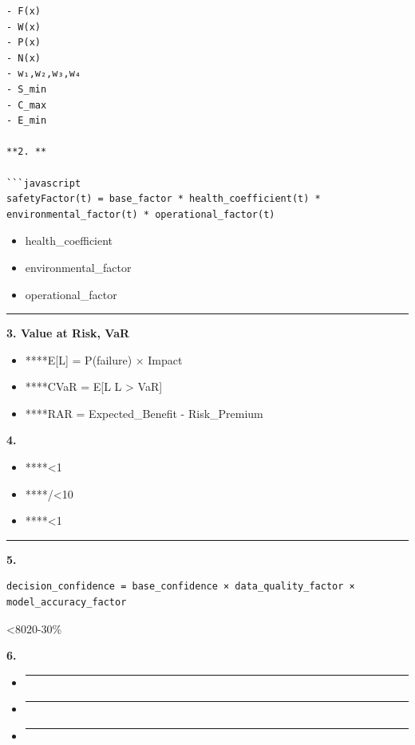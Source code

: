 \begin{verbatim}
- F(x)
- W(x)  
- P(x)
- N(x)
- w₁,w₂,w₃,w₄
- S_min
- C_max
- E_min

**2. **

```javascript
safetyFactor(t) = base_factor * health_coefficient(t) * environmental_factor(t) * operational_factor(t)
\end{verbatim}

\begin{itemize}
\tightlist
\item
  health\_coefficient
\item
  environmental\_factor
\item
  operational\_factor
\end{itemize}

\begin{center}\rule{0.5\linewidth}{0.5pt}\end{center}

\textbf{3. Value at Risk, VaR}

\begin{itemize}
\tightlist
\item
  ****E{[}L{]} = P(failure) × Impact
\item
  ****CVaR = E{[}L \textbar{} L \textgreater{} VaR{]}
\item
  ****RAR = Expected\_Benefit - Risk\_Premium
\end{itemize}

\textbf{4. }

\begin{itemize}
\tightlist
\item
  ****\textless1
\item
  ****/\textless10
\item
  ****\textless1
\end{itemize}

\begin{center}\rule{0.5\linewidth}{0.5pt}\end{center}

\textbf{5. }

\begin{verbatim}
decision_confidence = base_confidence × data_quality_factor × model_accuracy_factor
\end{verbatim}

\textless8020-30\%

\textbf{6. }

\begin{itemize}
\item
  \begin{center}\rule{0.5\linewidth}{0.5pt}\end{center}
\item
  \begin{center}\rule{0.5\linewidth}{0.5pt}\end{center}
\item
  \begin{center}\rule{0.5\linewidth}{0.5pt}\end{center}
\end{itemize}

